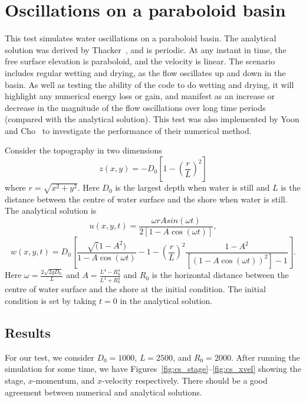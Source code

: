 \section{Oscillations on a paraboloid basin}
This test simulates water oscillations on a paraboloid basin. The analytical solution was derived by Thacker~\cite{Thacker1981}, and is periodic. At any instant in time, the free surface elevation is paraboloid, and the velocity is linear. The scenario includes regular wetting and drying, as the flow oscillates up and down in the basin. As well as testing the ability of the code to do wetting and drying, it will highlight any numerical energy loss or gain, and manifest as an increase or decrease in the magnitude of the flow oscillations over long time periods (compared with the analytical solution). This test was also implemented by Yoon and Cho~\cite{YC2001} to investigate the performance of their numerical method.

Consider the topography in two dimensions
\begin{equation}
z(x,y) = -D_0\left[1 -\left(\frac{r}{L}\right)^2\right]
\end{equation}
where $r=\sqrt{x^2 + y^2}$. Here $D_0$ is the largest depth when water is still and $L$ is the distance between the centre of water surface and the shore when water is still.
The analytical solution is 
\begin{equation}
u(x,y,t) = \frac{\omega r A sin{(\omega t)}}{ 2 \left[1 -A \cos(\omega t)\right] },
\end{equation}
\begin{equation}
w(x,y,t) = D_0 \left[\frac{\sqrt(1-A^2)}{1-A\cos(\omega t)}  -1 
-\left( \frac{r}{L}\right)^2 \frac{1-A^2}{[(1-A\cos(\omega t))^2]-1} \right].
\end{equation}
Here $\omega=\frac{2\sqrt{2 g D_0}}{L}$ and $A = \frac{L^4 - R_0^4}{L^4 + R_0^4}$ and $R_0$ is the horizontal distance between the centre of water surface and the shore at the initial condition.
The initial condition is set by taking $t=0$ in the analytical solution.

\subsection{Results}
For our test, we consider $D_0=1000$, $L=2500$, and $R_0=2000$.
After running the simulation for some time, we have Figures~\ref{fig:cs_stage}--\ref{fig:cs_xvel} showing the stage, $x$-momentum, and $x$-velocity respectively. There should be a good agreement between numerical and analytical solutions.

